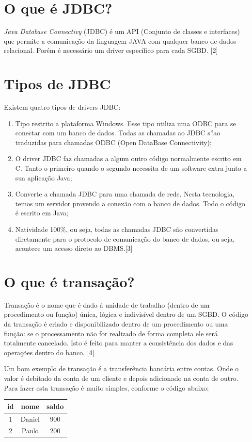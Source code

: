 \documentclass[12pt,a4paper]{article}
\begin{document}
\section{O que é JDBC? }
\textit{Java Database Connectivy} (JDBC) é um API (Conjunto de classes e interfaces) que permite a comunicação da linguagem JAVA com qualquer banco de dados relacional. Porém é necessário um driver específico para cada SGBD.  [2]
\section{Tipos de JDBC}
Existem quatro tipos de drivers JDBC:

\begin{enumerate}
\item Tipo restrito a plataforma Windows. Esse tipo utiliza uma ODBC para se conectar com um banco de dados. Todas as chamadas ao JDBC s”ao traduzidas para chamadas ODBC (Open DataBase Connectivity);

\item O driver JDBC faz chamadas a algum outro código normalmente escrito em C.  Tanto o primeiro quando o segundo necessita de um software extra junto a sua aplicação Java;

\item Converte a chamada JDBC para uma chamada de rede. Nesta tecnologia, temos um servidor provendo a conexão com o banco de dados. Todo o código é escrito em Java;

\item Natividade 100\%, ou seja, todas as chamadas JDBC são convertidas diretamente para o protocolo de comunicação do banco de dados, ou seja, acontece um acesso direto ao DBMS.[3]

\end{enumerate}

\section{O que é transação? }
Transação é o nome que é dado à unidade de trabalho (dentro de um procedimento ou função) única, lógica e indivisível dentro de um SGBD. O código da transação é criado e disponibilizado dentro de um procedimento ou uma função: se o processamento não for realizado de forma completa ele será totalmente cancelado. Isto é feito para manter a consistência dos dados e das operações dentro do banco. [4]

Um bom exemplo de transação é a transferência bancária entre contas. Onde o valor é debitado da conta de um cliente e depois adicionado na conta de outro. 
Para fazer esta transação é muito simples, conforme o código abaixo:
\begin{center}
\begin{tabular}{|c|c|c|}
\hline 
id & nome & saldo \\ 
\hline 
1 & Daniel & 900 \\ 
\hline 
2 & Paulo & 200 \\ 
\hline 
\end{tabular} 
\end{center}
 
 
\end{document}
